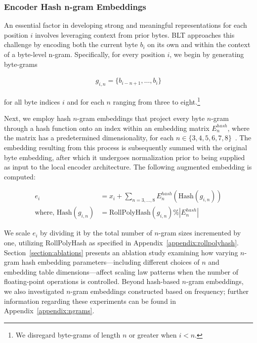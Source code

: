 \subsubsection{Encoder Hash n-gram Embeddings}
\label{sec:ngram-emb}
\label{sec:hash-emb}
An essential factor in developing strong and meaningful representations for each position $i$ involves leveraging context from prior bytes. {\textsc BLT} approaches this challenge by encoding both the current byte $b_i$ on its own and within the context of a byte-level n-gram. Specifically, for every position $i$, we begin by generating byte-grams

\begin{align}
    g_{i,n}=\{b_{i-n + 1},\ldots, b_i\}
\end{align}

for all byte indices $i$ and for each $n$ ranging from three to eight.\footnote{
We disregard byte-grams of length $n$ or greater when $i < n$. }

Next, we employ hash $n$-gram embeddings that project every byte $n$-gram through a hash function onto an index within an embedding matrix $E_{n}^{hash}$, where the matrix has a predetermined dimensionality, for each $n \in \{3,4,5,6,7,8\}$~\citep{bai2010learning}.
The embedding resulting from this process is subsequently summed with the original byte embedding, after which it undergoes normalization prior to being supplied as input to the local encoder architecture. The following augmented embedding is computed:

\begin{align}
e_i &= x_i + \sum_{n = 3,...,8}E_{n}^{hash}(\text{Hash}(g_{i,n})) \\
\text{where, Hash}(g_{i,n}) &= \text{RollPolyHash}(g_{i,n}) \% |E_{n}^{hash}|
\end{align}

We scale $e_i$ by dividing it by the total number of $n$-gram sizes incremented by one, utilizing RollPolyHash as specified in Appendix~\ref{appendix:rollpolyhash}. Section~\ref{section:ablations} presents an ablation study examining how varying $n$-gram hash embedding parameters—including different choices of $n$ and embedding table dimensions—affect scaling law patterns when the number of floating-point operations is controlled. Beyond hash-based $n$-gram embeddings, we also investigated $n$-gram embeddings constructed based on frequency; further information regarding these experiments can be found in Appendix~\ref{appendix:ngrams}.


